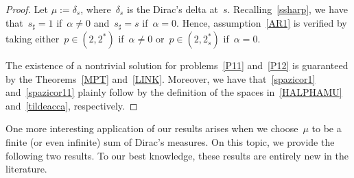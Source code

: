 \documentclass[12pt,a4paper,intlimits,sumlimits]{amsart}
\theoremstyle{definition}
\theoremstyle{plain}
\numberwithin{equation}{section}
\begin{document}
\begin{proof}
Let $\mu:=\delta_s$, where~$\delta_s$ is the Dirac's delta at~$s$.
Recalling~\eqref{ssharp}, we have that~$s_\sharp=1$ if~$\alpha\neq0$ and~$s_\sharp=s$ if~$\alpha=0$.
Hence, assumption~\eqref{AR1} is verified by taking either~$p\in (2, 2^*)$ if~$\alpha\neq 0$ or~$p\in (2, 2^*_s)$ if~$\alpha =0$.

The existence of a nontrivial solution for problems~\eqref{P11} and~\eqref{P12} is guaranteed by the Theorems~\ref{MPT} and~\ref{LINK}.
Moreover, we have that~\eqref{spazicor1} and~\eqref{spazicor11} plainly follow by the definition of the spaces in~\eqref{HALPHAMU} and~\eqref{tildeacca}, respectively.
\end{proof}

One more interesting application of our results arises when we choose~$\mu$ to be a finite (or even infinite) sum of Dirac's measures.  On this topic, we provide the following two results.
To our best knowledge,  these results are entirely new in the literature.
\end{document}
